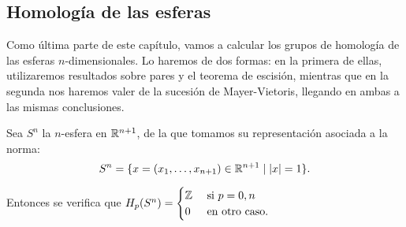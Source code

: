 \subsection{Homología de las esferas}

Como última parte de este capítulo, vamos a calcular los grupos de homología de las esferas
$n$-dimensionales. Lo haremos de dos formas: en la primera de ellas, utilizaremos resultados
sobre pares y el teorema de escisión, mientras que en la segunda nos haremos valer de la
sucesión de Mayer-Vietoris, llegando en ambas a las mismas conclusiones.

\begin{theorem}
  Sea $S^n$ la $n$-esfera en $\mathbb{R}^{n+1}$, de la que tomamos su representación asociada a la norma:
  \[S^n = \{x = (x_1, \dots, x_{n+1}) \in \mathbb{R}^{n+1} \mid |x| = 1\}. \]

  Entonces se verifica que $H_p(S^n) = \begin{cases}  \mathbb{Z} & \text{ si } p = 0, n \\
                                         0 & \text{ en otro caso.} \end{cases}$
\end{theorem}


